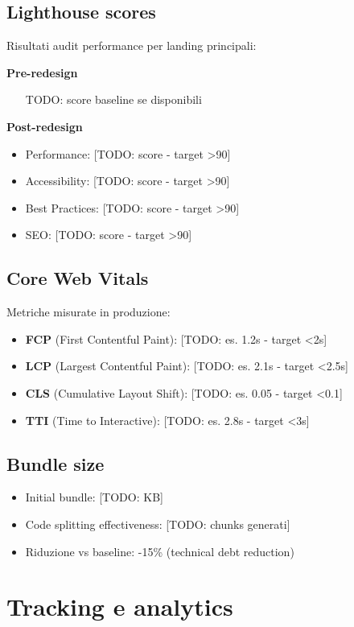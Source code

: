 \subsection{Lighthouse scores}
Risultati audit performance per landing principali:

\textbf{Pre-redesign}
\begin{itemize}
  \item [TODO: score baseline se disponibili]
\end{itemize}

\textbf{Post-redesign}
\begin{itemize}
  \item Performance: [TODO: score - target >90]
  \item Accessibility: [TODO: score - target >90]
  \item Best Practices: [TODO: score - target >90]
  \item SEO: [TODO: score - target >90]
\end{itemize}

\subsection{Core Web Vitals}
Metriche misurate in produzione:
\begin{itemize}
  \item \textbf{FCP} (First Contentful Paint): [TODO: es. 1.2s - target <2s]
  \item \textbf{LCP} (Largest Contentful Paint): [TODO: es. 2.1s - target <2.5s]
  \item \textbf{CLS} (Cumulative Layout Shift): [TODO: es. 0.05 - target <0.1]
  \item \textbf{TTI} (Time to Interactive): [TODO: es. 2.8s - target <3s]
\end{itemize}

\subsection{Bundle size}
\begin{itemize}
  \item Initial bundle: [TODO: KB]
  \item Code splitting effectiveness: [TODO: chunks generati]
  \item Riduzione vs baseline: -15\% (technical debt reduction)
\end{itemize}

\section{Tracking e analytics}
